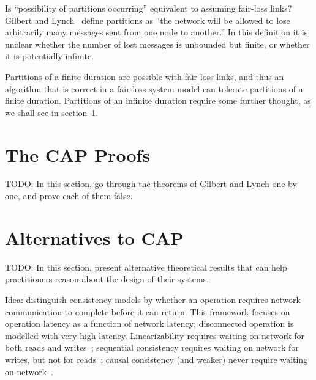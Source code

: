 \documentclass[a4paper,twocolumn,10pt]{article}
\begin{document}
Is ``possibility of partitions occurring'' equivalent to assuming fair-loss links? Gilbert and
Lynch~\cite{Gilbert2002il} define partitions as ``the network will be allowed to lose arbitrarily
many messages sent from one node to another.'' In this definition it is unclear whether the number
of lost messages is unbounded but finite, or whether it is potentially infinite.

Partitions of a finite duration are possible with fair-loss links, and thus an algorithm that is
correct in a fair-loss system model can tolerate partitions of a finite duration. Partitions of an
infinite duration require some further thought, as we shall see in section~\ref{sec:proofs}.

\section{The CAP Proofs}\label{sec:proofs}

TODO: In this section, go through the theorems of Gilbert and Lynch one by one, and prove each of
them false.

%

\section{Alternatives to CAP}\label{sec:alternatives}

TODO: In this section, present alternative theoretical results that can help practitioners reason
about the design of their systems.

Idea: distinguish consistency models by whether an operation requires network communication to
complete before it can return. This framework focuses on operation latency as a function of network
latency; disconnected operation is modelled with very high latency. Linearizability requires waiting
on network for both reads and writes~\cite{Attiya1994gw}; sequential consistency requires waiting on
network for writes, but not for reads~\cite{Attiya1994gw, Lipton1988uh}; causal consistency (and
weaker) never require waiting on network~\cite{Mahajan2011wz}.
\end{document}
